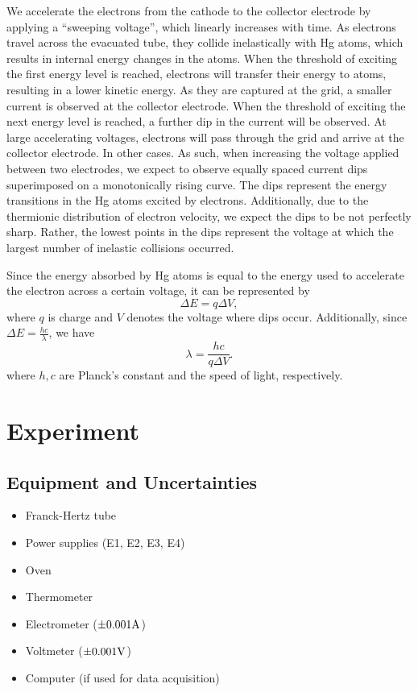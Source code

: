 \documentclass[12pt]{article}
\begin{document}
We accelerate the electrons from the cathode to the collector electrode by applying a \enquote{sweeping voltage}, which linearly increases with time. As electrons travel across the evacuated tube, they collide inelastically with Hg atoms, which results in internal energy changes in the atoms. When the threshold of exciting the first energy level is reached, electrons will transfer their energy to atoms, resulting in a lower kinetic energy. As they are captured at the grid, a smaller current is observed at the collector electrode. When the threshold of exciting the next energy level is reached, a further dip in the current will be observed. At large accelerating voltages, electrons will pass through the grid and arrive at the collector electrode. In other cases. As such, when increasing the voltage applied between two electrodes, we expect to observe equally spaced current dips superimposed on a monotonically rising curve\autocite{franckhertz_mit}. The dips represent the energy transitions in the Hg atoms excited by electrons. Additionally, due to the thermionic distribution of electron velocity, we expect the dips to be not perfectly sharp\autocite{franckhertz_mit}. Rather, the lowest points in the dips represent the voltage at which the largest number of inelastic collisions occurred.

Since the energy absorbed by Hg atoms is equal to the energy used to accelerate the electron across a certain voltage, it can be represented by
\begin{equation}
    \Delta E = q \Delta V,
    \label{eq:electrical_energy}
\end{equation}
where $q$ is charge and $V$ denotes the voltage where dips occur. Additionally, since $\Delta E=\frac{hc}{\lambda}$, we have
\begin{equation}
    \lambda = \frac{hc}{q\Delta V}.
    \label{eq:Franck}
\end{equation}
where $h,c$ are Planck's constant and the speed of light, respectively.

\section{Experiment}
\subsection{Equipment and Uncertainties}
\begin{itemize}
  \item Franck-Hertz tube 
  \item Power supplies (E1, E2, E3, E4)
  \item Oven
  \item Thermometer
  \item Electrometer ($\pm 0.001{\rm A}$)
  \item Voltmeter ($\pm 0.001{\rm V}$)
  \item Computer (if used for data acquisition)
\end{itemize}
\end{document}
